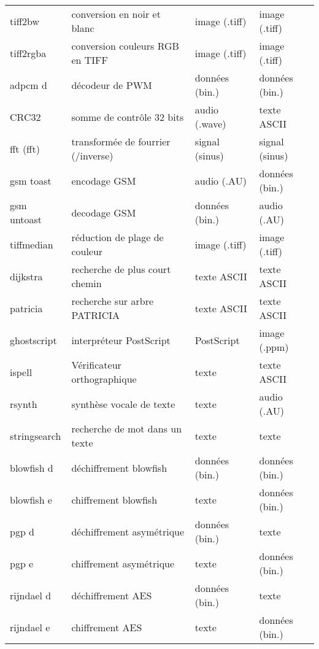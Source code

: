 \documentclass[french, a4paper, 11pt, twoside, pdftex]{StyleThese}
\begin{document}
\begin{longtable}{@{}llll@{}}
		tiff2bw      & conversion en noir et blanc          & image (.tiff)      & image (.tiff)    \\
		tiff2rgba    & conversion couleurs RGB en TIFF		& image (.tiff)      & image (.tiff)    \\
		adpcm d      & décodeur de PWM                      & données (bin.)  	 & données (bin.)   \\
		CRC32        & somme de contrôle 32 bits     		& audio (.wave)      & texte ASCII      \\
  	fft (fft\up{-1}) & transformée de fourrier (/inverse)	& signal (sinus)	 & signal (sinus)	\\
		gsm toast    & encodage GSM                         & audio (.AU)        & données (bin.)   \\
		gsm untoast  & decodage GSM                         & données (bin.)     & audio (.AU)	    \\
		tiffmedian   & réduction de plage de couleur      	& image (.tiff)      & image (.tiff)    \\
		dijkstra     & recherche de plus court chemin		& texte ASCII        & texte ASCII      \\
		patricia     & recherche sur arbre PATRICIA			& texte ASCII        & texte ASCII      \\
		ghostscript  & interpréteur PostScript              & PostScript		 & image (.ppm)     \\
		ispell       & Vérificateur orthographique          & texte              & texte ASCII		\\
		rsynth       & synthèse vocale de texte             & texte              & audio (.AU)      \\
		stringsearch & recherche de mot dans un texte		& texte              & texte            \\
		blowfish d   & déchiffrement blowfish               & données (bin.)  	 & données (bin.)   \\
		blowfish e   & chiffrement blowfish                 & texte              & données (bin.)   \\
		pgp d        & déchiffrement asymétrique      		& données (bin.)  	 & texte            \\
		pgp e        & chiffrement asymétrique				& texte              & données (bin.)   \\
		rijndael d   & déchiffrement AES                    & données (bin.)  	 & texte            \\
		rijndael e   & chiffrement AES                      & texte              & données (bin.)   \\
\end{longtable}
\end{document}
